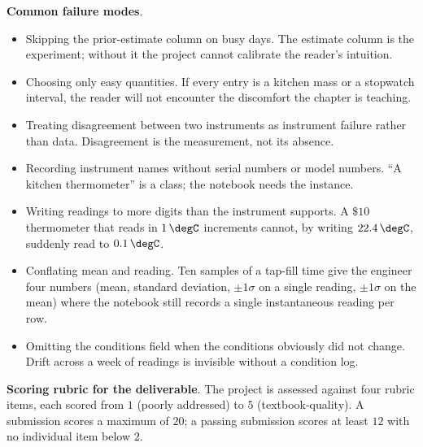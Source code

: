 \begin{project}
\textbf{Common failure modes}.
\begin{itemize}[leftmargin=*]
  \item Skipping the prior-estimate column on busy days. The
    estimate column is the experiment; without it the project
    cannot calibrate the reader's intuition.
  \item Choosing only easy quantities. If every entry is a
    kitchen mass or a stopwatch interval, the reader will not
    encounter the discomfort the chapter is teaching.
  \item Treating disagreement between two instruments as
    instrument failure rather than data. Disagreement is the
    measurement, not its absence.
  \item Recording instrument names without serial numbers or
    model numbers. ``A kitchen thermometer'' is a class; the
    notebook needs the instance.
  \item Writing readings to more digits than the instrument
    supports. A $\$10$ thermometer that reads in $1 \,\degC$
    increments cannot, by writing $22.4 \,\degC$, suddenly read
    to $0.1 \,\degC$.
  \item Conflating mean and reading. Ten samples of a tap-fill
    time give the engineer four numbers (mean, standard
    deviation, $\pm 1\sigma$ on a single reading, $\pm 1\sigma$
    on the mean) where the notebook still records a single
    instantaneous reading per row.
  \item Omitting the conditions field when the conditions
    obviously did not change. Drift across a week of readings is
    invisible without a condition log.
\end{itemize}

\textbf{Scoring rubric for the deliverable}.
The project is assessed against four rubric items, each scored
from $1$ (poorly addressed) to $5$ (textbook-quality). A submission
scores a maximum of $20$; a passing submission scores at least
$12$ with no individual item below $2$.


\end{project}
